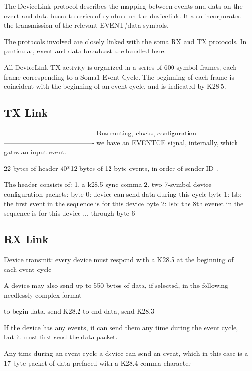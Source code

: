 
The DeviceLink protocol describes the mapping between events and
data on the event and data buses to series of symbols on the
devicelink. It also incorporates the transmission of the relevant
EVENT/data symbols.

The protocols involved are closely linked with the soma RX and TX
protocols. In particular, event and data broadcast are handled here.


All DeviceLink TX activity is organized in a series of 600-symbol
frames, each frame corresponding to a Soma1 Event Cycle. The beginning
of each frame is coincident with the beginning of an event cycle, and
is indicated by K28.5.


\subsection{TX Link} 


----------------------------------------
Bus routing, clocks, configuration
----------------------------------------
we have an EVENTCE signal, internally, which gates an input event. 

22 bytes of header
40*12 bytes of 12-byte events, in order of sender ID .

The header consists of:
1. a k28.5 sync comma
2. two 7-symbol device configuration packets:
byte 0: device can send data during this cycle
byte 1: lsb: the first event in the sequence is for this device
byte 2: lsb: the 8th evenet in the sequence is for this device
... through byte 6


\subsection{RX Link}

Device transmit:
every device must respond with a K28.5 at the beginning of each event cycle

A device may also send up to 550 bytes of data, if selected, in the following needlessly complex format

to begin data, send K28.2
to end data, send K28.3

If the device has any events, it can send them any time during the event cycle, but it must first send the data packet. 


Any time during an event cycle a device can send an event, which in
this case is a 17-byte packet of data prefaced with a K28.4 comma
character

